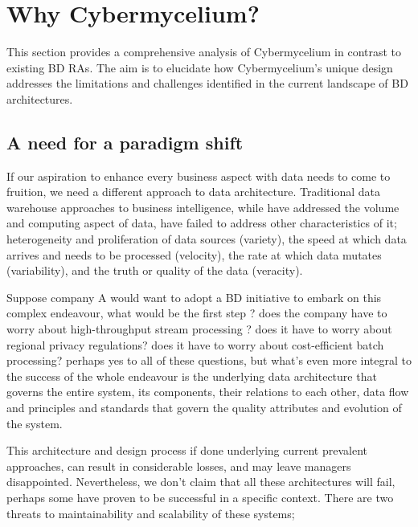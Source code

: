 \documentclass[review]{elsarticle}
\begin{document}
\section{Why Cybermycelium?} \label{theory-section}

This section provides a comprehensive analysis of Cybermycelium in contrast to existing BD RAs. The aim is to elucidate how Cybermycelium's unique design addresses the limitations and challenges identified in the current landscape of BD architectures.





\subsection{A need for a paradigm shift} \label{need for paradigm shift}

If our aspiration to enhance every business aspect with data needs to come to fruition, we need a different approach to data architecture. Traditional data warehouse approaches to business intelligence, while have addressed the volume and computing aspect of data, have failed to address other characteristics of it; heterogeneity and proliferation of data sources (variety), the speed at which data arrives and needs to be processed (velocity), the rate at which data mutates (variability), and the truth or quality of the data (veracity).


Suppose company A would want to adopt a BD initiative to embark on this complex endeavour, what would be the first step ? does the company have to worry about high-throughput stream processing ? does it have to worry about regional privacy regulations? does it have to worry about cost-efficient batch processing? perhaps yes to all of these questions, but what's even more integral to the success of the whole endeavour is the underlying data architecture that governs the entire system, its components, their relations to each other, data flow and principles and standards that govern the quality attributes and evolution of the system.

This architecture and design process if done underlying current prevalent approaches, can result in considerable losses, and may leave managers disappointed. Nevertheless, we don't claim that all these architectures will fail, perhaps some have proven to be successful in a specific context. There are two threats to maintainability and scalability of these systems;
\end{document}
